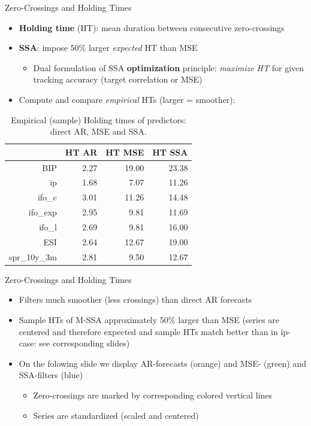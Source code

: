 \documentclass{beamer}
\begin{document}
\begin{frame} {Zero-Crossings and Holding Times}\label{htzc1}
\begin{itemize}
\item \textbf{Holding time} (HT): mean duration between consecutive zero-crossings
\item \textbf{SSA}: impose $50\%$ larger \emph{expected }HT than MSE 
\begin{itemize}
\item Dual formulation of SSA \textbf{optimization} principle: \emph{maximize HT} for given tracking accuracy (target correlation or MSE)
\end{itemize}
\item Compute and compare \emph{empirical} HTs (larger = smoother):
\end{itemize}

\begin{table}[ht]
\centering
\begin{tabular}{rrrr}
  \hline
 & HT AR & HT MSE & HT SSA \\ 
  \hline
BIP & 2.27 & 19.00 & 23.38 \\ 
  ip & 1.68 & 7.07 & 11.26 \\ 
  ifo\_c & 3.01 & 11.26 & 14.48 \\ 
  ifo\_exp & 2.95 & 9.81 & 11.69 \\ 
  ifo\_l & 2.69 & 9.81 & 16.00 \\ 
  ESI & 2.64 & 12.67 & 19.00 \\ 
  spr\_10y\_3m & 2.81 & 9.50 & 12.67 \\ 
   \hline
\end{tabular}
\caption{Empirical (sample) Holding times of predictors: direct AR, MSE and SSA.} 
\label{perf_var1}
\end{table}\end{frame}



\begin{frame} {Zero-Crossings and Holding Times}
\begin{itemize}
\item Filters much smoother (less crossings) than direct AR forecasts
\item Sample HTs of M-SSA approximately 50$\%$ larger than MSE (series are centered and therefore expected and sample HTs match better than in ip-case: see corresponding slides)
\item On the folowing slide we display AR-forecasts (orange) and MSE- (green) and SSA-filters (blue) 
\begin{itemize}
\item Zero-crossings are marked by corresponding colored vertical lines
\item Series are standardized (scaled and centered)
\end{itemize}
\end{itemize}
\end{frame}
\end{document}
